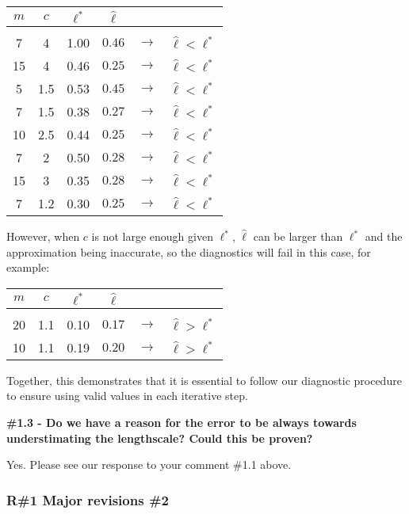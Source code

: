 \documentclass[11pt]{report}
\begin{document}
\begin{table}[h]
\centering
\begin{tabular}{ c c c c c c }
$m$ & $c$ & $\ell^*$ & $\hat{\ell}$ & \\ 
\hline \\[-4mm]
7  & 4   & 1.00 & $0.46$ & $\to$ & $\hat{\ell} < \ell^*$ \\
15 & 4   & 0.46 & $0.25$ & $\to$ & $\hat{\ell} < \ell^*$ \\
5  & 1.5 & 0.53 & $0.45$ & $\to$ & $\hat{\ell} < \ell^*$ \\
7  & 1.5 & 0.38 & $0.27$ & $\to$ & $\hat{\ell} < \ell^*$ \\
10 & 2.5 & 0.44 & $0.25$ & $\to$ & $\hat{\ell} < \ell^*$ \\
7  & 2   & 0.50 & $0.28$ & $\to$ & $\hat{\ell} < \ell^*$ \\
15 & 3   & 0.35 & $0.28$ & $\to$ & $\hat{\ell} < \ell^*$ \\
7  & 1.2 & 0.30 & $0.25$ & $\to$ & $\hat{\ell} < \ell^*$ \\
\end{tabular}
\end{table}

However, when $c$ is not large enough given $\ell^*$, $\hat{\ell}$ can be larger than $\ell^*$ and the approximation being inaccurate, so the diagnostics will fail in this case, for example:

\begin{table}[h]
\centering
\begin{tabular}{ c c c c c c }
$m$ & $c$ & $\ell^*$ & $\hat{\ell}$ & \\ 
\hline \\[-4mm]
20 & 1.1 & 0.10 & $0.17$ & $\to$ & $\hat{\ell} > \ell^*$ \\
10 & 1.1 & 0.19 & $0.20$ & $\to$ & $\hat{\ell} > \ell^*$ \\
\end{tabular}
\end{table}

Together, this demonstrates that it is essential to follow our diagnostic procedure to ensure using valid values in each iterative step.

\textbf{\#1.3 - Do we have a reason for the error to be always towards understimating the lengthscale? Could this be proven?}

Yes. Please see our response to your comment \#1.1 above.


\subsubsection*{R\#1 Major revisions \#2}
\end{document}
